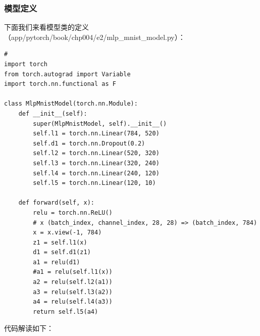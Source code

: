 \documentclass[UTF8]{article}
\begin{document}
\subsubsection{模型定义}
下面我们来看模型类的定义（app/pytorch/book/chp004/e2/mlp\_mnist\_model.py）：
\begin{lstlisting}
#
import torch
from torch.autograd import Variable
import torch.nn.functional as F

class MlpMnistModel(torch.nn.Module):
    def __init__(self):
        super(MlpMnistModel, self).__init__()
        self.l1 = torch.nn.Linear(784, 520)
        self.d1 = torch.nn.Dropout(0.2)
        self.l2 = torch.nn.Linear(520, 320)
        self.l3 = torch.nn.Linear(320, 240)
        self.l4 = torch.nn.Linear(240, 120)
        self.l5 = torch.nn.Linear(120, 10)

    def forward(self, x):
        relu = torch.nn.ReLU()
        # x (batch_index, channel_index, 28, 28) => (batch_index, 784)
        x = x.view(-1, 784)
        z1 = self.l1(x)
        d1 = self.d1(z1)
        a1 = relu(d1)
        #a1 = relu(self.l1(x))
        a2 = relu(self.l2(a1))
        a3 = relu(self.l3(a2))
        a4 = relu(self.l4(a3))
        return self.l5(a4)
\end{lstlisting}
代码解读如下：
\end{document}
